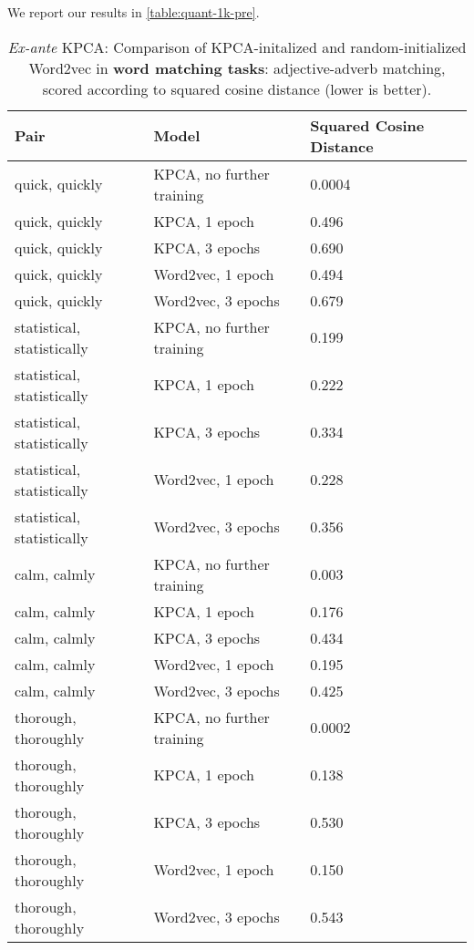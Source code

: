 We report our results in \cref{table:quant-1k-pre}.


\begin{table}[H]

\centering

\begin{tabular}{|l|l|l|}
\hline
\rowcolor[HTML]{C0C0C0} 
\textbf{Pair}  & \textbf{Model}          & \textbf{Squared Cosine Distance}                                                             \\ \hline
quick, quickly & KPCA, no further training & 0.0004\\ \hline
quick, quickly & KPCA, 1 epoch & 0.496\\ \hline
quick, quickly & KPCA, 3 epochs & 0.690\\ \hline
quick, quickly & Word2vec, 1 epoch & 0.494\\ \hline
quick, quickly & Word2vec, 3 epochs & 0.679\\ \hline
statistical, statistically & KPCA, no further training & 0.199\\ \hline
statistical, statistically & KPCA, 1 epoch & 0.222\\ \hline
statistical, statistically & KPCA, 3 epochs & 0.334\\ \hline
statistical, statistically & Word2vec, 1 epoch & 0.228\\ \hline
statistical, statistically & Word2vec, 3 epochs & 0.356\\ \hline
calm, calmly & KPCA, no further training & 0.003 \\ \hline
calm, calmly & KPCA, 1 epoch & 0.176\\ \hline
calm, calmly & KPCA, 3 epochs &0.434 \\ \hline
calm, calmly & Word2vec, 1 epoch & 0.195\\ \hline
calm, calmly & Word2vec, 3 epochs & 0.425\\ \hline
thorough, thoroughly & KPCA, no further training & 0.0002\\ \hline
thorough, thoroughly & KPCA, 1 epoch & 0.138\\ \hline
thorough, thoroughly & KPCA, 3 epochs & 0.530\\ \hline
thorough, thoroughly & Word2vec, 1 epoch & 0.150\\ \hline
thorough, thoroughly & Word2vec, 3 epochs & 0.543\\ \hline
\end{tabular}
\caption{\textit{Ex-ante} KPCA: Comparison of KPCA-initalized and random-initialized Word2vec in \textbf{word matching tasks}: adjective-adverb matching, scored according to squared cosine distance (lower is better).}
\label{table:synmatch-1k-pre}
\end{table}


